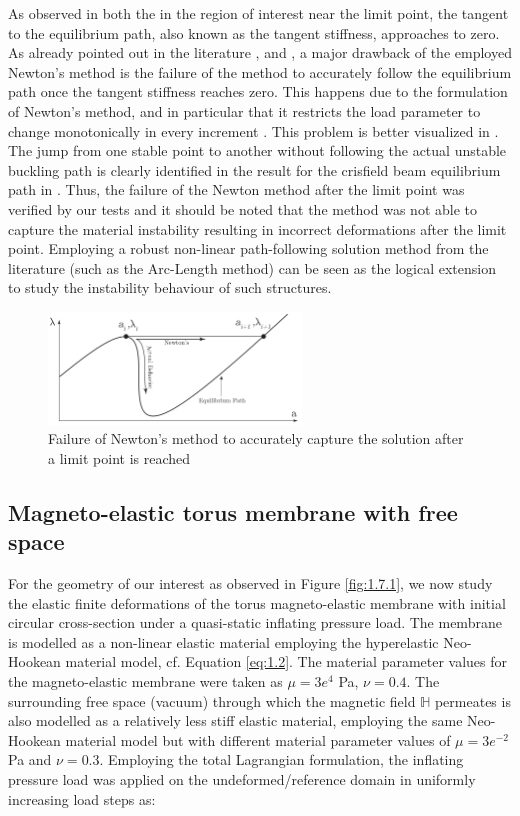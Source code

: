 \documentclass[11pt,a4paper,final]{article}
\begin{document}
As observed in both the  in the region of interest near the limit point, the tangent to the equilibrium path, also known as the tangent stiffness, approaches to zero. As already pointed out in the literature \cite{Riks1979}, \cite{CRISFIELD1981} and \cite{Vasios}, a major drawback of the employed Newton's method is the failure of the method to accurately follow the equilibrium path once the tangent stiffness reaches zero. This happens due to the formulation of Newton's method, and in particular that it restricts the load parameter to change monotonically in every increment \cite{Vasios}. This problem is better visualized in . The jump from one stable point to another without following the actual unstable buckling path is clearly identified in the result for the crisfield beam equilibrium path in . Thus, the failure of the Newton method after the limit point was verified by our tests and it should be noted that the method was not able to capture the material instability resulting in incorrect deformations after the limit point. Employing a robust non-linear path-following solution method from the literature \cite{CRISFIELD1981} (such as the Arc-Length method) can be seen as the logical extension to study the instability behaviour of such structures. \par 

\begin{figure}[h]
\centering
\includegraphics[width=0.6\textwidth]{newton_method_failure.png}
\caption{Failure of Newton's method to accurately capture the solution after a limit point is reached \cite{Vasios}}
\label{fig:1.17}
\end{figure}

\subsection{Magneto-elastic torus membrane with free space}
For the geometry of our interest as observed in Figure \eqref{fig:1.7.1}, we now study the elastic finite deformations of the torus magneto-elastic membrane with initial circular cross-section under a quasi-static inflating pressure load. The membrane is modelled as a non-linear elastic material employing the hyperelastic Neo-Hookean material model, cf. Equation \eqref{eq:1.2}. The material parameter values for the magneto-elastic membrane were taken as $\mu = 3e^4$ Pa, $\nu = 0.4$. The surrounding free space (vacuum) through which the magnetic field $\mathbb{H}$ permeates is also modelled as a relatively less stiff elastic material, employing the same Neo-Hookean material model but with different material parameter values of $\mu = 3e^{-2}$ Pa and $\nu = 0.3$. Employing the total Lagrangian formulation, the inflating pressure load was applied on the undeformed/reference domain in uniformly increasing load steps as:
\end{document}
